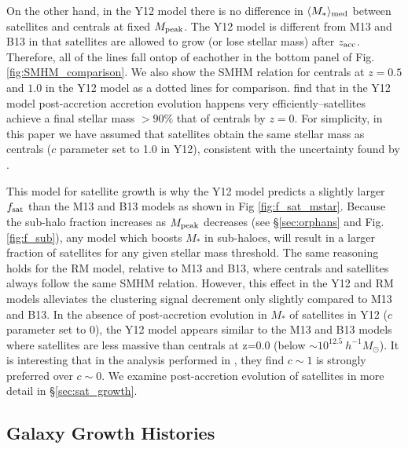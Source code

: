 \documentclass[a4paper,fleqn,usenatbib]{mnras}
\begin{document}
On the other hand, in the Y12 model there is no difference in $\langle M_*\rangle_{\rm med}$ between satellites and centrals at fixed $M_{\rm peak}$.  The Y12 model is different from M13 and B13 in that satellites are allowed to grow (or lose stellar mass) after $z_{\rm acc}$.  Therefore, all of the lines fall ontop of eachother in the bottom panel of Fig. \ref{fig:SMHM_comparison}.  We also show the SMHM relation for centrals at $z=0.5$ and $1.0$ in the Y12 model as a dotted lines for comparison.  \citet{Yang:2012ew} find that in the Y12 model post-accretion accretion evolution happens very efficiently--satellites achieve a final stellar mass $> 90\%$ that of centrals by $z=0$.  For simplicity, in this paper we have assumed that satellites obtain the same stellar mass as centrals ($c$ parameter set to 1.0 in Y12), consistent with the uncertainty found by \citet{Yang:2012ew}.  

This model for satellite growth is why the Y12 model predicts a slightly larger $f_{\rm sat}$ than the M13 and B13 models as shown in Fig \ref{fig:f_sat_mstar}.  Because the sub-halo fraction increases as $M_{\rm peak}$ decreases (see \S \ref{sec:orphans} and Fig. \ref{fig:f_sub}), any model which boosts $M_*$ in sub-haloes, will result in a larger fraction of satellites for any given stellar mass threshold.  The same reasoning holds for the RM model, relative to M13 and B13, where centrals and satellites always follow the same SMHM relation.  However, this effect in the Y12 and RM models alleviates the clustering signal decrement only slightly compared to M13 and B13.  In the absence of post-accretion evolution in $M_*$ of satellites in Y12 ($c$ parameter set to 0), the Y12 model appears similar to the M13 and B13 models where satellites are less massive than centrals at z=0.0 (below $\sim 10^{12.5} ~ h^{-1} M_{\odot}$).  It is interesting that in the analysis performed in \citet[][]{Yang:2012ew}, they find $c \sim 1$ is strongly preferred over $c \sim 0$.  We examine post-accretion evolution of satellites in more detail in \S \ref{sec:sat_growth}.


\subsection{Galaxy Growth Histories}
\end{document}
